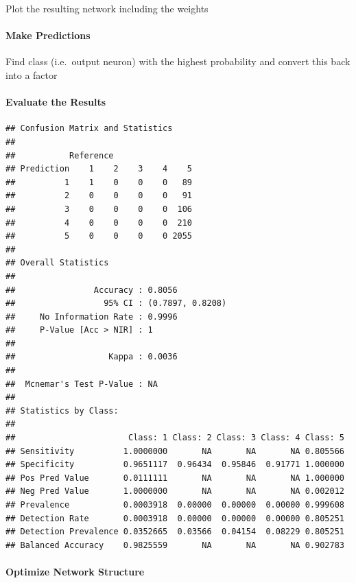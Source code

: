 \documentclass[
]{article}
\begin{document}
Plot the resulting network including the weights

\hypertarget{make-predictions}{%
\paragraph{Make Predictions}\label{make-predictions}}

Find class (i.e.~output neuron) with the highest probability and convert
this back into a factor

\hypertarget{evaluate-the-results}{%
\paragraph{Evaluate the Results}\label{evaluate-the-results}}

\begin{verbatim}
## Confusion Matrix and Statistics
## 
##           Reference
## Prediction    1    2    3    4    5
##          1    1    0    0    0   89
##          2    0    0    0    0   91
##          3    0    0    0    0  106
##          4    0    0    0    0  210
##          5    0    0    0    0 2055
## 
## Overall Statistics
##                                           
##                Accuracy : 0.8056          
##                  95% CI : (0.7897, 0.8208)
##     No Information Rate : 0.9996          
##     P-Value [Acc > NIR] : 1               
##                                           
##                   Kappa : 0.0036          
##                                           
##  Mcnemar's Test P-Value : NA              
## 
## Statistics by Class:
## 
##                       Class: 1 Class: 2 Class: 3 Class: 4 Class: 5
## Sensitivity          1.0000000       NA       NA       NA 0.805566
## Specificity          0.9651117  0.96434  0.95846  0.91771 1.000000
## Pos Pred Value       0.0111111       NA       NA       NA 1.000000
## Neg Pred Value       1.0000000       NA       NA       NA 0.002012
## Prevalence           0.0003918  0.00000  0.00000  0.00000 0.999608
## Detection Rate       0.0003918  0.00000  0.00000  0.00000 0.805251
## Detection Prevalence 0.0352665  0.03566  0.04154  0.08229 0.805251
## Balanced Accuracy    0.9825559       NA       NA       NA 0.902783
\end{verbatim}

\hypertarget{optimize-network-structure}{%
\paragraph{Optimize Network
Structure}\label{optimize-network-structure}}
\end{document}
